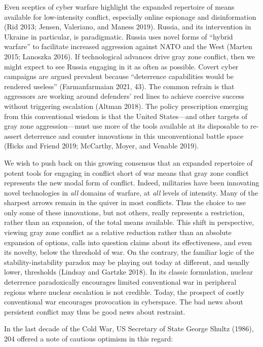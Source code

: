 \documentclass[
]{article}
\begin{document}
Even sceptics of cyber warfare highlight the expanded repertoire of means available for low-intensity conflict, especially online espionage and disinformation (Rid 2013; Jensen, Valeriano, and Maness 2019). Russia, and its intervention in Ukraine in particular, is paradigmatic. Russia uses novel forms of ``hybrid warfare'' to facilitate increased aggression against NATO and the West (Marten 2015; Lanoszka 2016). If technological advances drive gray zone conflict, then we might expect to see Russia engaging in it as often as possible. Covert cyber campaigns are argued prevalent because ``deterrence capabilities would be rendered useless'' (Farmanfarmaian 2021, 43). The common refrain is that aggressors are working around defenders' red lines to achieve coercive success without triggering escalation (Altman 2018). The policy prescription emerging from this conventional wisdom is that the United States---and other targets of gray zone aggression---must use more of the tools available at its disposable to re-assert deterrence and counter innovations in this unconventional battle space (Hicks and Friend 2019; McCarthy, Moyer, and Venable 2019).

We wish to push back on this growing consensus that an expanded repertoire of potent tools for engaging in conflict short of war means that gray zone conflict represents the new modal form of conflict. Indeed, militaries have been innovating novel technologies in \emph{all} domains of warfare, at \emph{all} levels of intensity. Many of the sharpest arrows remain in the quiver in most conflicts. Thus the choice to use only some of these innovations, but not others, really represents a restriction, rather than an expansion, of the total means available. This shift in perspective, viewing gray zone conflict as a relative reduction rather than an absolute expansion of options, calls into question claims about its effectiveness, and even its novelty, below the threshold of war. On the contrary, the familiar logic of the stability-instability paradox may be playing out today at different, and usually lower, thresholds (Lindsay and Gartzke 2018). In its classic formulation, nuclear deterrence paradoxically encourages limited conventional war in peripheral regions where nuclear escalation is not credible. Today, the prospect of costly conventional war encourages provocation in cyberspace. The bad news about persistent conflict may thus be good news about restraint.

In the last decade of the Cold War, US Secretary of State George Shultz (1986), 204 offered a note of cautious optimism in this regard:
\end{document}
